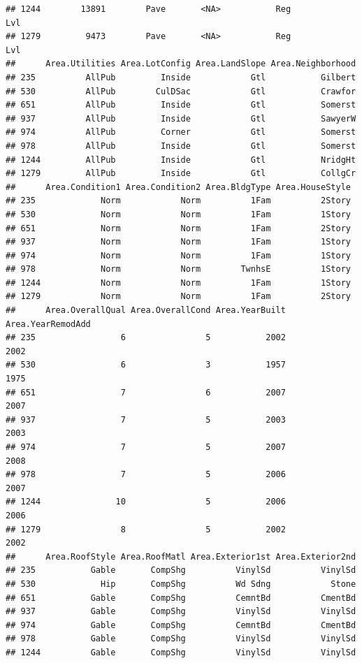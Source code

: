 \documentclass[]{article}
\begin{document}
\begin{verbatim}
## 1244        13891        Pave       <NA>           Reg              Lvl
## 1279         9473        Pave       <NA>           Reg              Lvl
##      Area.Utilities Area.LotConfig Area.LandSlope Area.Neighborhood
## 235          AllPub         Inside            Gtl           Gilbert
## 530          AllPub        CulDSac            Gtl           Crawfor
## 651          AllPub         Inside            Gtl           Somerst
## 937          AllPub         Inside            Gtl           SawyerW
## 974          AllPub         Corner            Gtl           Somerst
## 978          AllPub         Inside            Gtl           Somerst
## 1244         AllPub         Inside            Gtl           NridgHt
## 1279         AllPub         Inside            Gtl           CollgCr
##      Area.Condition1 Area.Condition2 Area.BldgType Area.HouseStyle
## 235             Norm            Norm          1Fam          2Story
## 530             Norm            Norm          1Fam          1Story
## 651             Norm            Norm          1Fam          2Story
## 937             Norm            Norm          1Fam          1Story
## 974             Norm            Norm          1Fam          1Story
## 978             Norm            Norm        TwnhsE          1Story
## 1244            Norm            Norm          1Fam          1Story
## 1279            Norm            Norm          1Fam          2Story
##      Area.OverallQual Area.OverallCond Area.YearBuilt Area.YearRemodAdd
## 235                 6                5           2002              2002
## 530                 6                3           1957              1975
## 651                 7                6           2007              2007
## 937                 7                5           2003              2003
## 974                 7                5           2007              2008
## 978                 7                5           2006              2007
## 1244               10                5           2006              2006
## 1279                8                5           2002              2002
##      Area.RoofStyle Area.RoofMatl Area.Exterior1st Area.Exterior2nd
## 235           Gable       CompShg          VinylSd          VinylSd
## 530             Hip       CompShg          Wd Sdng            Stone
## 651           Gable       CompShg          CemntBd          CmentBd
## 937           Gable       CompShg          VinylSd          VinylSd
## 974           Gable       CompShg          CemntBd          CmentBd
## 978           Gable       CompShg          VinylSd          VinylSd
## 1244          Gable       CompShg          VinylSd          VinylSd

\end{verbatim}
\end{document}
